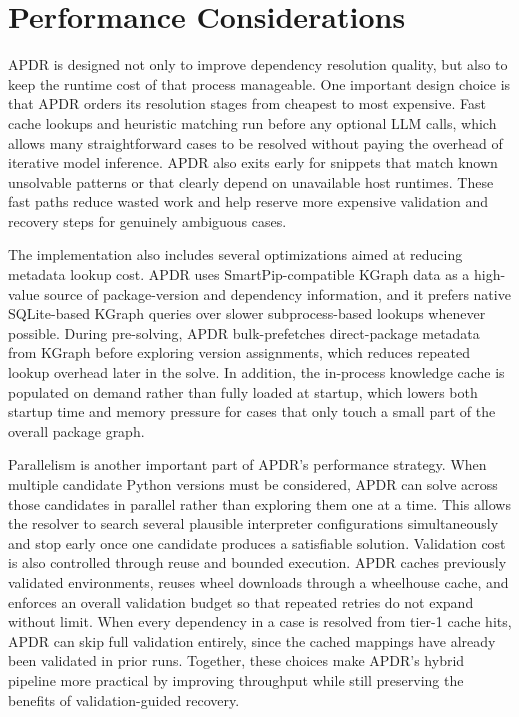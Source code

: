 \documentclass[conference]{IEEEtran}
\begin{document}
\section{Performance Considerations}
APDR is designed not only to improve dependency resolution quality, but also to keep the runtime cost of that process manageable. One important design choice is that APDR orders its resolution stages from cheapest to most expensive. Fast cache lookups and heuristic matching run before any optional LLM calls, which allows many straightforward cases to be resolved without paying the overhead of iterative model inference. APDR also exits early for snippets that match known unsolvable patterns or that clearly depend on unavailable host runtimes. These fast paths reduce wasted work and help reserve more expensive validation and recovery steps for genuinely ambiguous cases.

The implementation also includes several optimizations aimed at reducing metadata lookup cost. APDR uses SmartPip-compatible KGraph data as a high-value source of package-version and dependency information, and it prefers native SQLite-based KGraph queries over slower subprocess-based lookups whenever possible. During pre-solving, APDR bulk-prefetches direct-package metadata from KGraph before exploring version assignments, which reduces repeated lookup overhead later in the solve. In addition, the in-process knowledge cache is populated on demand rather than fully loaded at startup, which lowers both startup time and memory pressure for cases that only touch a small part of the overall package graph.

Parallelism is another important part of APDR's performance strategy. When multiple candidate Python versions must be considered, APDR can solve across those candidates in parallel rather than exploring them one at a time. This allows the resolver to search several plausible interpreter configurations simultaneously and stop early once one candidate produces a satisfiable solution. Validation cost is also controlled through reuse and bounded execution. APDR caches previously validated environments, reuses wheel downloads through a wheelhouse cache, and enforces an overall validation budget so that repeated retries do not expand without limit. When every dependency in a case is resolved from tier-1 cache hits, APDR can skip full validation entirely, since the cached mappings have already been validated in prior runs. Together, these choices make APDR's hybrid pipeline more practical by improving throughput while still preserving the benefits of validation-guided recovery.
\end{document}
